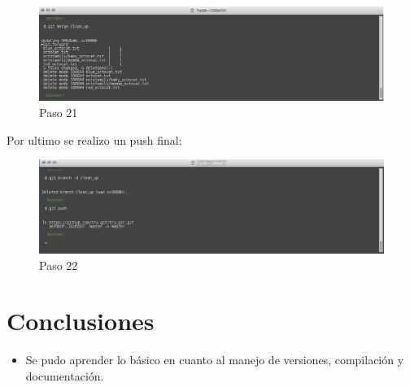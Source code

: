\documentclass[11pt]{article}
\begin{document}
\begin{figure}[H]
\centering
\includegraphics[scale=0.8]{img/21.png}
\caption{Paso 21}
\label{fig:21}
\end{figure}
Por ultimo se realizo un push final:
\begin{figure}[H]
\centering
\includegraphics[scale=0.8]{img/22.png}
\caption{Paso 22}
\label{fig:22}
\end{figure}

\section{Conclusiones}

\begin{itemize}
\item Se pudo aprender lo básico en cuanto al manejo de versiones, compilación y documentación.
\end{itemize}
\end{document}
